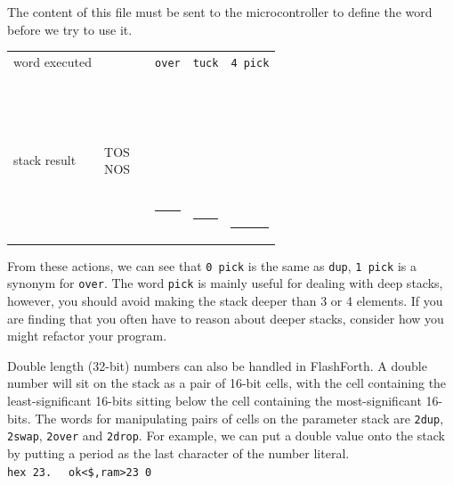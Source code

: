 \documentclass[12pt,a4paper]{article}
\begin{document}
The content of this file must be sent to the microcontroller to define the word before we try to use it. 
\begin{center}
 \begin{tabular}{lc|cccc}
 word executed & & & \verb!over! & \verb!tuck! & \verb!4 pick! \\
 \\
 stack result  
 & \parbox[t]{35pt}{TOS \\ NOS} 
 & \parbox[t]{30pt}{ \\  \\  \\  \\ \rule{30pt}{2pt}} 
 & \parbox[t]{30pt}{ \\  \\  \\  \\  \\ \rule{30pt}{2pt}}
 & \parbox[t]{30pt}{ \\  \\  \\  \\  \\  \\ \rule{30pt}{2pt}}
 & \parbox[t]{30pt}{ \\  \\  \\  \\  \\  \\  \\ \rule{30pt}{2pt}}
 \end{tabular}
\end{center}
From these actions, we can see that \verb!0 pick! is the same as \verb!dup!,
\verb!1 pick! is a synonym for \verb!over!.
The word \verb!pick! is mainly useful for dealing with deep stacks, however,
you should avoid making the stack deeper than 3 or 4 elements.
If you are finding that you often have to reason about deeper stacks, 
consider how you might refactor your program.

\medskip
Double length (32-bit) numbers can also be handled in FlashForth.
A double number will sit on the stack as a pair of 16-bit cells, 
with the cell containing the least-significant 16-bits 
sitting below the cell containing the most-significant 16-bits. 
The words for manipulating pairs of cells on the parameter stack are
\verb!2dup!, \verb!2swap!, \verb!2over! and \verb!2drop!.
For example, we can put a double value onto the stack by putting a period
as the last character of the number literal.\vspace{7pt} \\
\verb!hex 23.! \fbox{$\hookleftarrow$} \verb!  ok<$,ram>23 0! \vspace{7pt} \\
\end{document}
